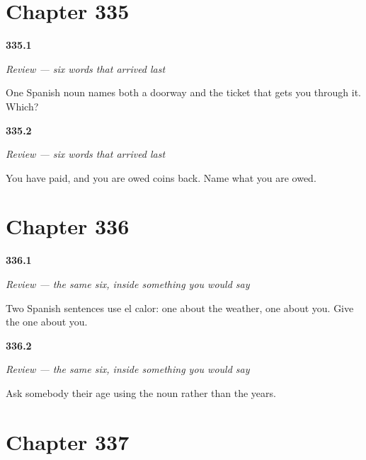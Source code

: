 \section*{Chapter 335}

\noindent\begin{minipage}[t]{\linewidth}
\raggedright
\hypertarget{review-ES-C335-repaso-seis-palabras-entrada}{\textbf{335.1}} \emph{Review --- six words that arrived last}\par
\small One Spanish noun names both a doorway and the ticket that gets you through it. Which?
\end{minipage}\par\medskip

\noindent\begin{minipage}[t]{\linewidth}
\raggedright
\hypertarget{review-ES-C335-repaso-seis-palabras-cambio}{\textbf{335.2}} \emph{Review --- six words that arrived last}\par
\small You have paid, and you are owed coins back. Name what you are owed.
\end{minipage}\par\medskip

\section*{Chapter 336}

\noindent\begin{minipage}[t]{\linewidth}
\raggedright
\hypertarget{review-ES-C336-repaso-seis-en-uso-calor}{\textbf{336.1}} \emph{Review --- the same six, inside something you would say}\par
\small Two Spanish sentences use el calor: one about the weather, one about you. Give the one about you.
\end{minipage}\par\medskip

\noindent\begin{minipage}[t]{\linewidth}
\raggedright
\hypertarget{review-ES-C336-repaso-seis-en-uso-edad}{\textbf{336.2}} \emph{Review --- the same six, inside something you would say}\par
\small Ask somebody their age using the noun rather than the years.
\end{minipage}\par\medskip

\section*{Chapter 337}

